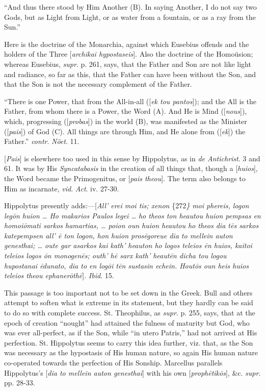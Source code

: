 ``And thus there stood by Him Another (B). In saying Another, I
do not say two Gods, but as Light from Light, or as water from a
fountain, or as a ray from the Sun.''

Here is the doctrine of the Monarchia, against which Eusebius
offends and the holders of the Three [\emph{archikai hypostaseis}].
Also the doctrine of the Homoüsion; whereas Eusebius, \emph{supr}. p.
261, says, that the Father and Son are not like light and radiance, so
far as this, that the Father can have been without the Son, and that
the Son is not the necessary complement of the Father.

``There is one Power, that from the All-in-all ([\emph{ek tou
pantos}]); and the All is the Father, from whom there is a Power,
the Word (A). And He is Mind ([\emph{nous}]), which, progressing ([\emph{probas}])
in the world (B), was manifested as the Minister ([\emph{pais}]) of
God (C). All things are through Him, and He alone from ([\emph{ek}])
the Father.'' \emph{contr}. \emph{Nöet}. 11.

[\emph{Pais}] is elsewhere too used in this sense by Hippolytus, as
in \emph{de Antichrist}. 3 and 61. It was by His \emph{Syncatabasis}
in the creation of all things that, though a [\emph{huios}], the Word
became the Primogenitus, or [\emph{pais theou}]. The term also belongs
to Him as incarnate, \emph{vid}. \emph{Act}. iv. 27-30.

Hippolytus presently adds:—[\emph{All' erei moi tis; xenon} \{272\emph{\}
moi phereis, logon leg\={o}n huion … Ho makarios Paulos legei …
ho theos ton heautou huion pempsas en homoi\={o}mati sarkos
hamartias, … poion oun huion heautou ho theos dia t\={e}s sarkos
katepempsen all' \={e} ton logon, hon huion pros\={e}goreue dia
to mellein auton genesthai; … oute gar asarkos kai kath' heauton ho
logos teleios \={e}n huios, kaitoi teleios logos \={o}n monogen\={e}s;
outh' h\={e} sarx kath' heaut\={e}n dicha tou logou hupostanai \={e}dunato,
dia to en log\={o}i t\={e}n sustasin echein. Hout\={o}s oun
heis huios teleios theou ephaner\={o}th\={e}}]. \emph{Ibid}.
15.

This passage is too important not to be set down in the Greek. Bull
and others attempt to soften what is extreme in its statement, but
they hardly can be said to do so with complete success. St. Theophilus,
as \emph{supr}. p. 255, says, that at the epoch of creation ``nought''
had attained the fulness of maturity but God, who was ever
all-perfect, as if the Son, while ``in utero Patris,'' had not
arrived at His perfection. St. Hippolytus seems to carry this idea
further, viz. that, as the Son was necessary as the hypostasis of His
human nature, so again His human nature co-operated towards the
perfection of His Sonship. Marcellus parallels Hippolytus's [\emph{dia to
mellein auton genesthai}] with his own [\emph{proph\={e}tik\={o}s}],
\&c. \emph{supr}. pp. 28-33.

